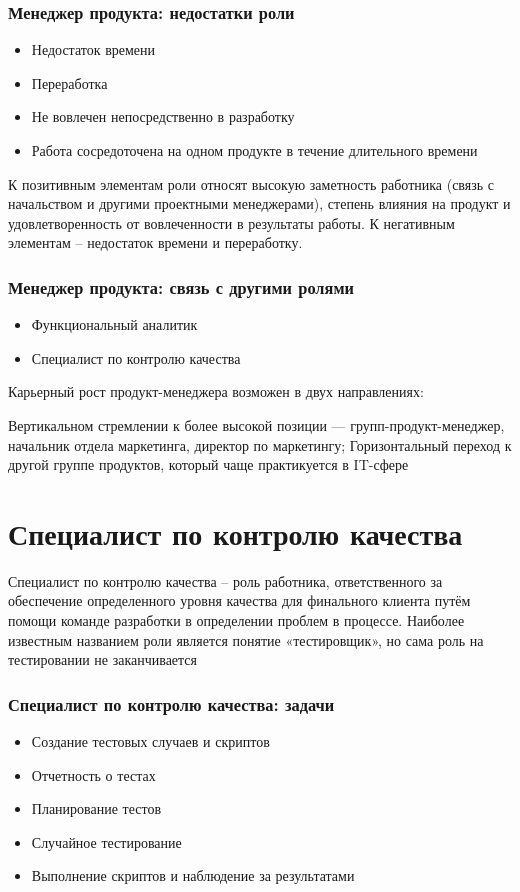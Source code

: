 \documentclass{../industrial-development}
\begin{document}
\begin{frame} \frametitle{Менеджер продукта: недостатки роли}
  \begin{itemize}
  \item Недостаток времени
  \item Переработка
  \item Не вовлечен непосредственно в разработку
  \item Работа сосредоточена на одном продукте в течение длительного времени
  \end{itemize}
\end{frame}

\lecturenotes

К позитивным элементам роли относят высокую заметность работника (связь с начальством и другими проектными менеджерами), степень влияния на продукт и удовлетворенность от вовлеченности в результаты работы. 
К негативным элементам – недостаток времени и переработку. 
  ~\cite{Anatomy}

\begin{frame} \frametitle{Менеджер продукта: связь с другими ролями}
  \begin{itemize}
  \item Функциональный аналитик
  \item Специалист по контролю качества
  \end{itemize}
\end{frame}
\lecturenotes
Карьерный рост продукт-менеджера возможен в двух направлениях:

Вертикальном стремлении к более высокой позиции — групп-продукт-менеджер, начальник отдела маркетинга, директор по маркетингу;
Горизонтальный переход к другой группе продуктов, который чаще практикуется в IT-сфере

\section{Специалист по контролю качества }

\lecturenotes

Специалист по контролю качества – роль работника, ответственного за обеспечение определенного уровня качества для финального клиента путём помощи команде разработки в определении проблем в процессе. Наиболее известным названием роли является понятие «тестировщик», но сама роль на тестировании не заканчивается  ~\cite{Anatomy}

\begin{frame} \frametitle{Специалист по контролю качества: задачи}
  \begin{itemize}
  \item Создание тестовых случаев и скриптов
  \item Отчетность о тестах
  \item Планирование тестов
  \item Случайное тестирование
  \item Выполнение скриптов и наблюдение за результатами 
  \end{itemize}
\end{frame}
\end{document}
